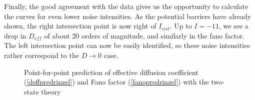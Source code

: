 \documentclass[12pt,a4paper]{article}
\begin{document}
Finally, the good agreement with the data gives us the opportunity to calculate the curves for even lower noise intensities. As the potential barriers have already shown, the right intersection point is now right of $I_{crit}$. Up to $I=-11$, we see a drop in $D_{eff}$ of about 20 orders of magnitude, and similarly in the fano factor. The left intersection point can now be easily identified, so these noise intensities rather correspond to the $D\rightarrow0$ case.
\begin{figure}[H]
	\hspace*{-0.5cm}
	\caption{Point-for-point prediction of effective diffusion coefficient (\ref{deffpredrinzel}) and Fano factor (\ref{fanopredrinzel}) with the two-state theory}
\end{figure}
\end{document}
